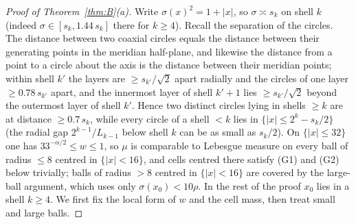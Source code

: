 \documentclass[11pt]{amsart}
\newcommand{\abs}[1]{\lvert #1\rvert}
\theoremstyle{plain}
\theoremstyle{definition}
\theoremstyle{remark}
\begin{document}
\begin{proof}[Proof of Theorem~\ref{thm:B}(a)]
Write $\sigma(x)^2=1+\abs x$, so $\sigma\asymp s_k$ on shell $k$ (indeed
$\sigma\in[s_k,1.44\,s_k]$ there for $k\ge4$). Recall the separation of the
circles. The distance between two coaxial circles equals the distance between
their generating points in the meridian half-plane, and likewise the distance
from a point to a circle about the axis is the distance between their
meridian points; within shell $k'$ the layers
are $\ge s_{k'}/\sqrt2$ apart radially and the circles of one layer
$\ge0.78\,s_{k'}$ apart, and the innermost layer of shell $k'+1$ lies
$\ge s_{k'}/\sqrt2$ beyond the outermost layer of shell $k'$. Hence two distinct circles lying in shells $\ge k$
are at distance $\ge0.7\,s_k$, while every circle of a shell $<k$ lies in
$\{\abs x\le2^k-s_k/2\}$ (the radial gap $2^{k-1}/L_{k-1}$ below shell $k$ can be
as small as $s_k/2$). On $\{\abs x\le32\}$ one has $33^{-\alpha/2}\le w\le1$, so
$\mu$ is comparable to Lebesgue measure on every ball of radius $\le8$ centred in
$\{\abs x<16\}$, and cells centred there satisfy (G1) and (G2) below trivially;
balls of radius $>8$ centred in $\{\abs x<16\}$ are covered by the large-ball
argument, which uses only $\sigma(x_0)<10\rho$. In the rest of the proof $x_0$ lies
in a shell $k\ge4$. We first fix the local form of $w$ and the cell mass, then
treat small and large balls.


\end{proof}
\end{document}
